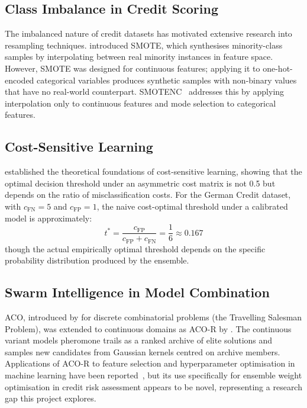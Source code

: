 \documentclass[12pt,a4paper]{article}
\begin{document}
\subsection{Class Imbalance in Credit Scoring}

The imbalanced nature of credit datasets has motivated extensive research into resampling techniques. \citet{chawla2002smote} introduced SMOTE, which synthesises minority-class samples by interpolating between real minority instances in feature space. However, SMOTE was designed for continuous features; applying it to one-hot-encoded categorical variables produces synthetic samples with non-binary values that have no real-world counterpart. SMOTENC~\citep{chawla2002smote} addresses this by applying interpolation only to continuous features and mode selection to categorical features.

\subsection{Cost-Sensitive Learning}

\citet{elkan2001foundations} established the theoretical foundations of cost-sensitive learning, showing that the optimal decision threshold under an asymmetric cost matrix is not 0.5 but depends on the ratio of misclassification costs. For the German Credit dataset, with $c_\text{FN} = 5$ and $c_\text{FP} = 1$, the naive cost-optimal threshold under a calibrated model is approximately:
\[
t^* = \frac{c_\text{FP}}{c_\text{FP} + c_\text{FN}} = \frac{1}{6} \approx 0.167
\]
though the actual empirically optimal threshold depends on the specific probability distribution produced by the ensemble.

\pagebreak
\subsection{Swarm Intelligence in Model Combination}

ACO, introduced by \citet{dorigo1992optimization} for discrete combinatorial problems (the Travelling Salesman Problem), was extended to continuous domains as ACO-R by \citet{socha2008ant}. The continuous variant models pheromone trails as a ranked archive of elite solutions and samples new candidates from Gaussian kernels centred on archive members. Applications of ACO-R to feature selection and hyperparameter optimisation in machine learning have been reported~\citep{yu2014improved}, but its use specifically for ensemble weight optimisation in credit risk assessment appears to be novel, representing a research gap this project explores.
\end{document}
